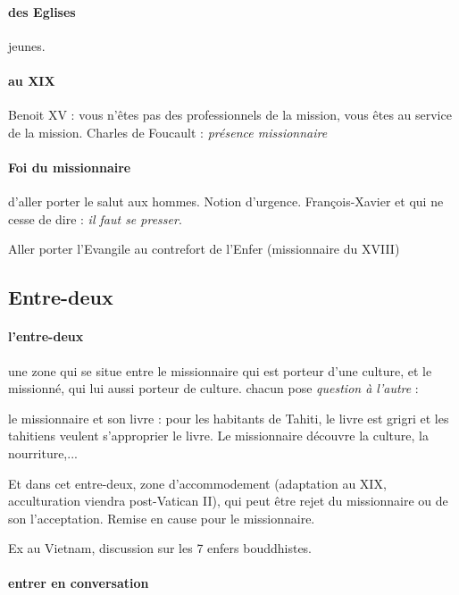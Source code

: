 \paragraph{des Eglises} jeunes.

 \paragraph{au XIX} Benoit XV : vous n'êtes pas des professionnels de la mission, vous êtes au service de la mission. Charles de Foucault : \textit{présence missionnaire}

 \paragraph{Foi du missionnaire} d'aller porter le salut aux hommes.
 Notion d'urgence. François-Xavier et qui ne cesse de dire :  \textit{il faut se presser}.
\begin{singlequote}
    Aller porter l'Evangile au contrefort de l'Enfer (missionnaire du XVIII)
\end{singlequote}

\subsection{Entre-deux}

\paragraph{l'entre-deux} une zone qui se situe entre le missionnaire qui est porteur d'une culture, et le missionné, qui lui aussi porteur de culture. chacun pose \textit{question à l'autre} : 
\begin{Ex}
    le missionnaire et son livre : pour les habitants de Tahiti, le livre est grigri et les tahitiens veulent s'approprier le livre.
    Le missionnaire découvre la culture, la nourriture,...
\end{Ex}
Et dans cet entre-deux, zone d'accommodement (adaptation au XIX, acculturation viendra post-Vatican II), qui peut être rejet du missionnaire ou de son l'acceptation. Remise en cause pour le missionnaire.
\begin{Ex}
    Ex au Vietnam, discussion sur les 7 enfers bouddhistes. 
\end{Ex}


\paragraph{entrer en conversation}


